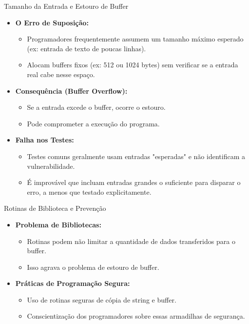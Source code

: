 \begin{frame}{Tamanho da Entrada e Estouro de Buffer}
    \begin{itemize}
        \item \textbf{O Erro de Suposição:}
              \begin{itemize}
                  \item Programadores frequentemente assumem um tamanho máximo esperado (ex: entrada de texto de poucas linhas).
                  \item Alocam buffers fixos (ex: 512 ou 1024 bytes) sem verificar se a entrada real cabe nesse espaço.
              \end{itemize}

        \item \textbf{Consequência (Buffer Overflow):}
              \begin{itemize}
                  \item Se a entrada excede o buffer, ocorre o estouro.
                  \item Pode comprometer a execução do programa.
              \end{itemize}

        \item \textbf{Falha nos Testes:}
              \begin{itemize}
                  \item Testes comuns geralmente usam entradas "esperadas" e não identificam a vulnerabilidade.
                  \item É improvável que incluam entradas grandes o suficiente para disparar o erro, a menos que testado explicitamente.
              \end{itemize}
    \end{itemize}
\end{frame}

\begin{frame}{Rotinas de Biblioteca e Prevenção}
    \begin{itemize}
        \item \textbf{Problema de Bibliotecas:}
              \begin{itemize}
                  \item Rotinas podem não limitar a quantidade de dados transferidos para o buffer.
                  \item Isso agrava o problema de estouro de buffer.
              \end{itemize}

        \item \textbf{Práticas de Programação Segura:}
              \begin{itemize}
                  \item Uso de rotinas seguras de cópia de string e buffer.
                  \item Conscientização dos programadores sobre essas armadilhas de segurança.
              \end{itemize}
    \end{itemize}
\end{frame}

